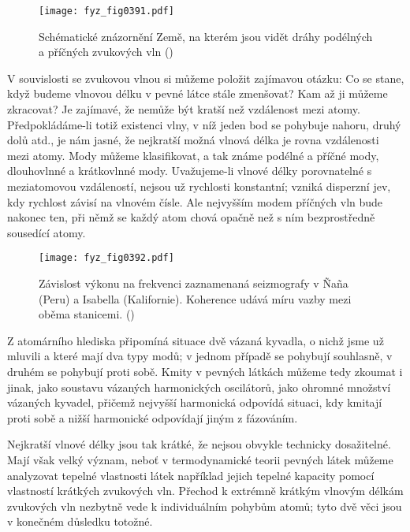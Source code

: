   \begin{figure}[ht!] %
    \centering
    \texttt{[image: fyz\_fig0391.pdf]}
    \caption{Schématické znázornění Země, na kterém jsou vidět dráhy podélných a příčných zvukových 
             vln
             (\cite[s.~690]{Feynman01})}
    \label{fyz:fig0391}
  \end{figure}
  
  V souvislosti se zvukovou vlnou si můžeme položit zajímavou otázku: Co se stane, když budeme 
  vlnovou délku v pevné látce stále zmenšovat? Kam až ji můžeme zkracovat? Je zajímavé, že nemůže 
  být kratší než vzdálenost mezi atomy. Předpokládáme-li totiž existenci vlny, v níž jeden bod se 
  pohybuje nahoru, druhý dolů atd., je nám jasné, že nejkratší možná vlnová délka je rovna 
  vzdálenosti mezi atomy. Mody můžeme klasifikovat, a tak známe podélné a příčné mody, dlouhovlnné 
  a krátkovlnné mody. Uvažujeme-li vlnové délky porovnatelné s meziatomovou vzdáleností, nejsou už 
  rychlosti konstantní; vzniká disperzní jev, kdy rychlost závisí na vlnovém čísle. Ale nejvyšším 
  modem příčných vln bude nakonec ten, při němž se každý atom chová opačně než s ním bezprostředně 
  sousedící atomy. 

  \begin{figure*} %
    \centering
    \texttt{[image: fyz\_fig0392.pdf]}
    \caption{Závislost výkonu na frekvenci zaznamenaná seizmografy v Ñaña (Peru) a Isabella 
             (Kalifornie). Koherence udává míru vazby mezi oběma stanicemi. 
             (\cite[s.~693]{Feynman01})}
    \label{fyz:fig0392}
  \end{figure*}
  Z atomárního hlediska připomíná situace dvě vázaná kyvadla, o nichž jsme už mluvili a které mají 
  dva typy modů; v jednom případě se pohybují souhlasně, v druhém se pohybují proti sobě. Kmity v 
  pevných látkách můžeme tedy zkoumat i jinak, jako soustavu vázaných harmonických oscilátorů, jako 
  ohromné množství vázaných kyvadel, přičemž nejvyšší harmonická odpovídá situaci, kdy kmitají 
  proti sobě a nižší harmonické odpovídají jiným z fázováním. 
  
  Nejkratší vlnové délky jsou tak krátké, že nejsou obvykle technicky dosažitelné. Mají však velký 
  význam, neboť v termodynamické teorii pevných látek můžeme analyzovat tepelné vlastnosti látek 
  například jejich tepelné kapacity pomocí vlastností krátkých zvukových vln. Přechod k extrémně 
  krátkým vlnovým délkám zvukových vln nezbytně vede k individuálním pohybům atomů; tyto dvě věci 
  jsou v konečném důsledku totožné. 

